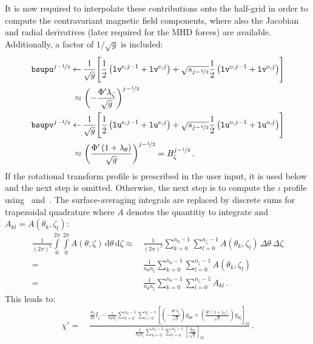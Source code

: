 It is now required to interpolate these contributions onto the half-grid
in order to compute the contravariant magnetic field components,
where also the Jacobian and radial derivatives (later required for the MHD forces) are available.
Additionally, a factor of $1/\sqrt{g}$ is included:
\begin{align}
  \texttt{bsupu}^{j-\nicefrac{1}{2}}
 \leftarrow&\,
  \frac{1}{\sqrt{g}} \Biggl[                      \frac{1}{2} \left( \texttt{lv}^{\mathrm{e}, j-1} + \texttt{lv}^{\mathrm{e}, j} \right)
                             + \sqrt{s_{j-\nicefrac{1}{2}}} \frac{1}{2} \left( \texttt{lv}^{\mathrm{o}, j-1} + \texttt{lv}^{\mathrm{o}, j} \right) \Biggr] \nonumber \\
    \approx&\, \left( - \frac{\Phi' \lambda_\zeta}{\sqrt{g}} \right)^{j-\nicefrac{1}{2}} \label{eqn:lu_half} \\
  \texttt{bsupv}^{j-\nicefrac{1}{2}}
 \leftarrow&\,
  \frac{1}{\sqrt{g}} \Biggl[                      \frac{1}{2} \left( \texttt{lu}^{\mathrm{e}, j-1} + \texttt{lu}^{\mathrm{e}, j} \right)
                             + \sqrt{s_{j-\nicefrac{1}{2}}} \frac{1}{2} \left( \texttt{lu}^{\mathrm{o}, j-1} + \texttt{lu}^{\mathrm{o}, j} \right) \Biggr] \nonumber \\
    \approx&\, \left( \frac{\Phi' \left(1 + \lambda_\theta\right)}{\sqrt{g}} \right)^{j-\nicefrac{1}{2}} = B_\zeta^{j-\nicefrac{1}{2}} \label{eqn:lv_half} \, .
\end{align}
If the rotational transform profile is prescribed in the user input, it is used below and the next step is omitted.
Otherwise, the next step is to compute the $\iota$ profile using~ and~.
The surface-averaging integrals are replaced by discrete sums for trapezoidal quadrature
where $A$ denotes the quantitiy to integrate and $A_{kl} = A(\theta_k, \zeta_l)$:
\begin{align}
  \frac{1}{(2 \pi)^2} \int\limits_0^{2 \pi} \int\limits_0^{2 \pi} A(\theta, \zeta) \,\mathrm{d}\theta \,\mathrm{d}\zeta
  \approx&\, \frac{1}{(2 \pi)^2} \sum\limits_{k=0}^{n_\theta - 1} \sum\limits_{l=0}^{n_\zeta - 1} A(\theta_k, \zeta_l) \,\Delta \theta \,\Delta \zeta \nonumber \\
        =&\, \frac{1}{n_\theta n_\zeta} \sum\limits_{k=0}^{n_\theta - 1} \sum\limits_{l=0}^{n_\zeta - 1} A(\theta_k, \zeta_l)  \nonumber \\
        =&\, \frac{1}{n_\theta n_\zeta} \sum\limits_{k=0}^{n_\theta - 1} \sum\limits_{l=0}^{n_\zeta - 1} A_{kl} \, .
\end{align}
This leads to:
\begin{align}
  \chi'
  =&\,
  \frac{\frac{\mu_0}{2 \pi} I_\zeta -
        \frac{1}{n_\theta n_\zeta} \sum\limits_{k=0}^{n_\theta - 1} \sum\limits_{l=0}^{n_\zeta - 1}
                                     \left[  \left(    - \frac{\Phi' \lambda_\zeta  }{\sqrt{g}} \right) g_{\theta \theta}
                                           + \left( \frac{\Phi' (1 + \lambda_\theta)}{\sqrt{g}} \right) g_{\theta \zeta } \right]_{kl}}
       {\frac{1}{n_\theta n_\zeta} \sum\limits_{k=0}^{n_\theta - 1} \sum\limits_{l=0}^{n_\zeta - 1}
                                     \left[ \frac{g_{\theta \theta}}{\sqrt{g}} \right]_{kl}} \, . \label{eqn:iota_from_current_discrete}
\end{align}
